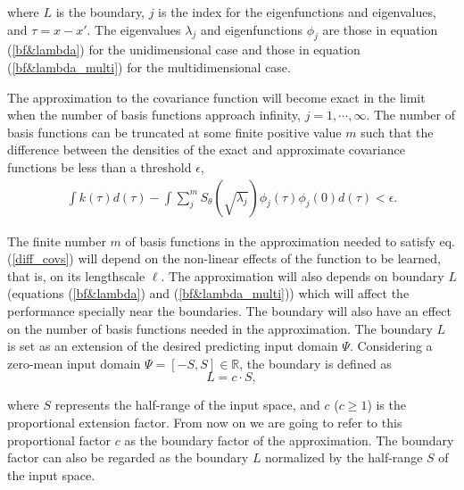 \documentclass[]{interact}
\theoremstyle{plain}%
\theoremstyle{definition}
\theoremstyle{remark}
\begin{document}
\noindent where $L$ is the boundary, $j$ is the index for the eigenfunctions and eigenvalues, and $\tau=x-x'$. The eigenvalues $\lambda_j$ and eigenfunctions $\phi_j$ are those in equation (\ref{bf&lambda}) for the unidimensional case and those in equation (\ref{bf&lambda_multi}) for the multidimensional case.

The approximation to the covariance function will become exact in the limit when the number of basis functions approach infinity, $j=1,\cdots,\infty$. The number of basis functions can be truncated at some finite positive value $m$ such that the difference between the densities of the exact and approximate covariance functions be less than a threshold $\epsilon$,
%
\begin{eqnarray}\label{diff_covs}
\int k(\tau)d(\tau) - \int \sum_{j}^m S_{\theta}(\sqrt{\lambda_j}) \phi_j(\tau) \phi_j(0) d(\tau) < \epsilon.
\end{eqnarray}

The finite number $m$ of basis functions in the approximation needed to satisfy eq. (\ref{diff_covs}) will depend on the non-linear effects of the function to be learned, that is, on its lengthscale $\ell$. The approximation will also depends on boundary $L$ (equations (\ref{bf&lambda}) and (\ref{bf&lambda_multi})) which will affect the performance specially near the boundaries. The boundary will also have an effect on the number of basis functions needed in the approximation. The boundary $L$ is set as an extension of the desired predicting input domain $\Psi$. Considering a zero-mean input domain $\Psi=[-S,S] \in \mathbb{R}$, the boundary is defined as
%
\begin{equation}
L=c \cdot S,
\end{equation} 

\noindent where $S$ represents the half-range of the input space, and $c$ ($c \ge 1$) is the proportional extension factor. From now on we are going to refer to this proportional factor $c$ as the boundary factor of the approximation. The boundary factor can also be regarded as the boundary $L$ normalized by the half-range $S$ of the input space.
\end{document}
